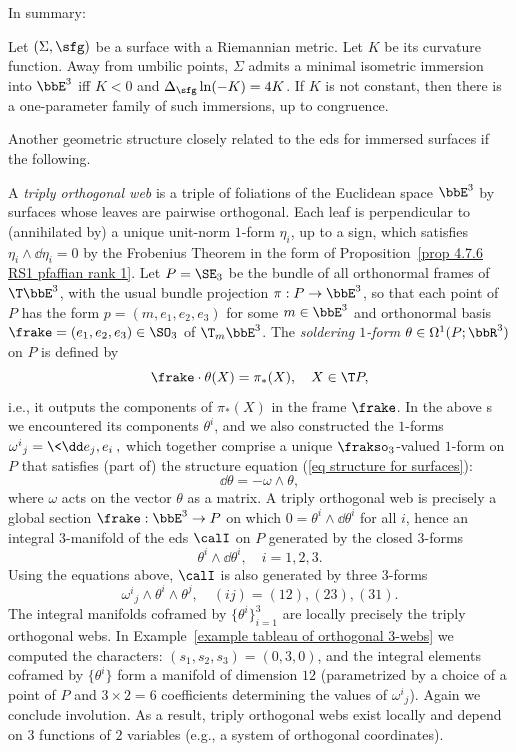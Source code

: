 In summary:
\begin{thm}
    Let $(\Sigma,\sfg)$ be a surface with a Riemannian metric. Let $K$ be its curvature function. Away from umbilic points, $\Sigma$ admits a minimal isometric immersion into $\bbE^3$ iff $K<0$ and $\Delta_{\sfg}\ln (-K)=4K$. If $K$ is not constant, then there is a one-parameter family of such immersions, up to congruence.
\end{thm}

Another geometric structure closely related to the \gls{eds} for immersed surfaces if the following.

\begin{example}\label{example orthogonal 3-webs}
    A \emph{triply orthogonal web} is a triple of foliations of the Euclidean space $\bbE^3$ by surfaces whose leaves are pairwise orthogonal. Each leaf is perpendicular to (annihilated by) a unique unit-norm $1$-form $\eta_i$, up to a sign, which satisfies $\eta_i\wedge\dd\eta_i=0$ by the Frobenius Theorem in the form of Proposition~\ref{prop 4.7.6 RS1 pfaffian rank 1}. Let $P=\SE_3$ be the bundle of all orthonormal frames of $\T\bbE^3$, with the usual bundle projection $\pi:P\to \bbE^3$, so that each point of $P$ has the form $p=(m,e_1,e_2,e_3)$ for some $m\in \bbE^3$ and orthonormal basis $\frake=(e_1,e_2,e_3)\in \SO_3$ of $\T_{m}\bbE^3$. The \emph{soldering $1$-form} $\theta\in \Omega^1(P;\bbR^3)$ on $P$ is defined by 
    \[\frake\cdot \theta(X)=\pi_\ast(X),\quad X\in \T P,\]
    i.e., it outputs the components of $\pi_\ast(X)$ in the frame $\frake$. In the above \sect s we encountered its components $\theta^i$, and we also constructed the $1$-forms 
    $\omega^i{}_j=\<\dd e_j,e_i\>,$
    which together comprise a unique $\frakso_3$-valued $1$-form on $P$ that satisfies (part of) the structure equation (\ref{eq structure for surfaces}):
    \[\dd \theta=-\omega\wedge\theta,\]
    where $\omega$ acts on the vector $\theta$ as a matrix. A triply orthogonal web is precisely a global section $\frake:\bbE^3\to P$  on which $0=\theta^i\wedge \dd\theta^i$ for all $i$, hence an integral $3$-manifold of the \gls{eds} $\calI$ on $P$ generated by the closed $3$-forms 
    \[\theta^i\wedge\dd\theta^i,\quad i=1,2,3.\]
    Using the equations above, $\calI$ is also generated by three $3$-forms
    \[\omega^i{}_j\wedge\theta^i\wedge\theta^j,\quad (ij)=(12),(23),(31).\]
    The integral manifolds coframed by $\{\theta^i\}_{i=1}^3$ are locally precisely the triply orthogonal webs. In Example~\ref{example tableau of orthogonal 3-webs} we computed the characters: $(s_1,s_2,s_3)=(0,3,0)$, and the integral elements coframed by $\{\theta^i\}$ form a manifold of dimension $12$ (parametrized by a choice of a point of $P$ and $3\times 2=6$ coefficients determining the values of $\omega^i{}_j$). Again we conclude involution. As a result, triply orthogonal webs exist locally and depend on $3$ functions of $2$ variables (e.g., a system of orthogonal coordinates).
\end{example}

